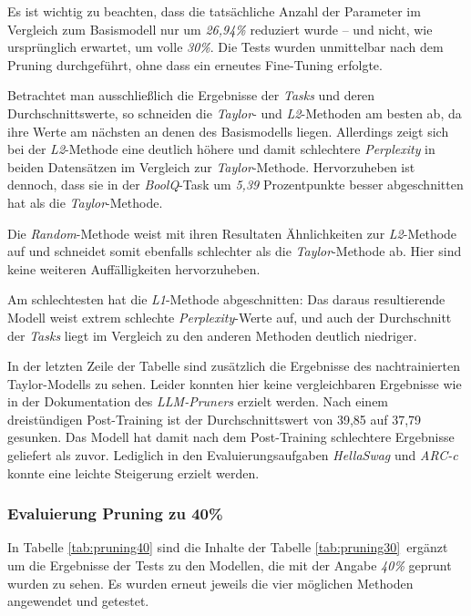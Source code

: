 Es ist wichtig zu beachten, dass die tatsächliche Anzahl der Parameter im
Vergleich zum Basismodell nur um \emph{26,94\%} reduziert wurde – und nicht, wie
ursprünglich erwartet, um volle \emph{30\%}. Die Tests wurden unmittelbar nach
dem Pruning durchgeführt, ohne dass ein erneutes Fine-Tuning erfolgte.

Betrachtet man ausschließlich die Ergebnisse der \emph{Tasks} und deren
Durchschnittswerte, so schneiden die \emph{Taylor}- und \emph{L2}-Methoden am
besten ab, da ihre Werte am nächsten an denen des Basismodells liegen.
Allerdings zeigt sich bei der \emph{L2}-Methode eine deutlich höhere und damit
schlechtere \emph{Perplexity} in beiden Datensätzen im Vergleich zur
\emph{Taylor}-Methode. Hervorzuheben ist dennoch, dass sie in der
\emph{BoolQ}-Task um \emph{5,39} Prozentpunkte besser abgeschnitten hat als die
\emph{Taylor}-Methode.

Die \emph{Random}-Methode weist mit ihren Resultaten Ähnlichkeiten zur
\emph{L2}-Methode auf und schneidet somit ebenfalls schlechter als die
\emph{Taylor}-Methode ab. Hier sind keine weiteren Auffälligkeiten
hervorzuheben.

Am schlechtesten hat die \emph{L1}-Methode abgeschnitten: Das daraus
resultierende Modell weist extrem schlechte \emph{Perplexity}-Werte auf, und
auch der Durchschnitt der \emph{Tasks} liegt im Vergleich zu den anderen
Methoden deutlich niedriger.

In der letzten Zeile der Tabelle sind zusätzlich die Ergebnisse des
nachtrainierten Taylor-Modells zu sehen. Leider konnten hier keine
vergleichbaren Ergebnisse wie in der Dokumentation des \emph{LLM-Pruners}
erzielt werden. Nach einem dreistündigen Post-Training ist der Durchschnittswert
von 39,85 auf 37,79 gesunken. Das Modell hat damit nach dem Post-Training
schlechtere Ergebnisse geliefert als zuvor. Lediglich in den
Evaluierungsaufgaben \emph{HellaSwag} und \emph{ARC-c} konnte eine leichte
Steigerung erzielt werden.

\subsubsection{Evaluierung Pruning zu 40\%}

In Tabelle \ref{tab:pruning40} sind die Inhalte der Tabelle
\ref{tab:pruning30} ergänzt um die Ergebnisse der Tests zu den Modellen, die mit
der Angabe \emph{40\%} geprunt wurden zu sehen. Es wurden erneut jeweils die
vier möglichen Methoden angewendet und getestet.

